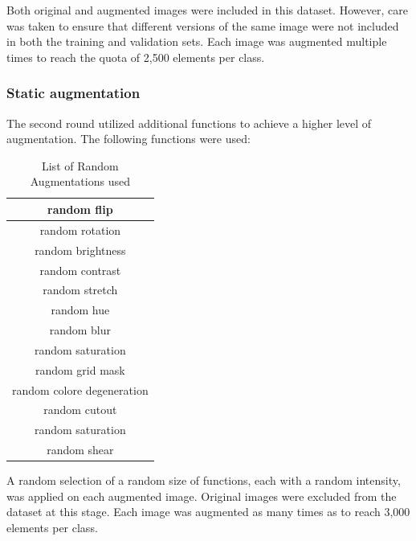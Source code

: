 \documentclass[11pt]{article}
\begin{document}
\begin{multicols}{2}
        
        Both original and augmented images were included in this dataset. 
        However, care was taken to ensure that different versions of the same image were not included in both the training and validation sets.
        Each image was augmented multiple times to reach the quota of 2,500 elements per class.
        
        \subsubsection{Static augmentation}
        
        The second round utilized additional functions to achieve a higher level of augmentation. 
        The following functions were used:

        \begin{table}[H]
            \centering
            \setlength{\tabcolsep}{5pt}
            \caption{List of Random Augmentations used}
            \begin{tabular}{|c|}
                \hline
                random flip \\
                \hline
                random rotation \\
                \hline
                random brightness \\
                \hline
                random contrast \\
                \hline
                random stretch \\
                \hline
                random hue \\
                \hline
                random blur \\
                \hline
                random saturation \\
                \hline
                random grid mask \\
                \hline
                random colore degeneration \\
                \hline
                random cutout \\
                \hline
                random saturation \\
                \hline
                random shear \\
                \hline
            \end{tabular}
            \label{tb:RandomTransforms2}
        \end{table}
        
        A random selection of a random size of functions, each with a random intensity, was applied on each augmented image.
        Original images were excluded from the dataset at this stage. 
        Each image was augmented as many times as to reach 3,000 elements per class.
        

\end{multicols}
\end{document}
